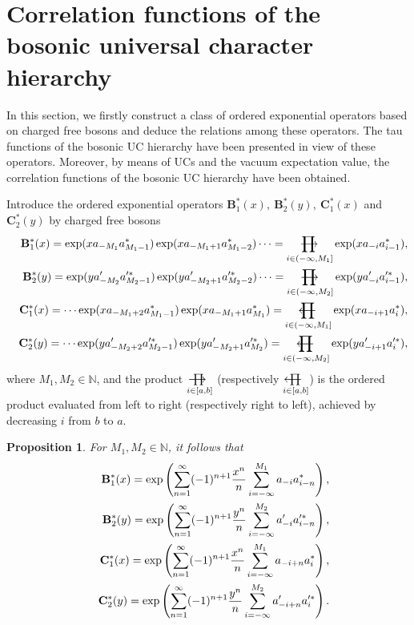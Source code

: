 \documentclass[10pt,a4paper]{amsart}
\numberwithin{equation}{section}
\newtheorem{proposition}[theorem]{Proposition}
\def\lprod{\mathop{\prod{\mkern-29.5mu}{\mathbf\longleftarrow}}}
\def\rprod{\mathop{\prod{\mkern-28.0mu}{\mathbf\longrightarrow}}}
\begin{document}
\section{Correlation functions of the bosonic universal character hierarchy}
In this section, we firstly construct a class of ordered exponential operators based on charged free bosons and deduce the relations among these operators. The tau functions of the bosonic UC hierarchy have been presented in view of these operators. Moreover, by means of UCs and  the vacuum expectation value, the correlation functions of the bosonic UC hierarchy have been obtained.



Introduce the ordered exponential operators $\mathbf{B}^{\ast}_{1}(x),\ \mathbf{B}^{\ast}_{2}(y),\ \mathbf{C}^{\ast}_{1}(x)$ and $\mathbf{C}^{\ast}_{2}(y)$  by charged free bosons
\begin{eqnarray}
&&\mathbf{B}^{\ast}_{1}(x)=\exp(xa_{-M_{1}}a^{\ast}_{M_{1}-1})
\exp(xa_{-M_{1}+1}a^{\ast}_{M_{1}-2})\cdots=\rprod\limits
_{i\in(-\infty,M_{1}]}\exp(xa_{-i}a^{\ast}_{i-1}),\notag\\
&&\mathbf{B}^{\ast}_{2}(y)=\exp(ya^{\prime}_{-M_{2}}a^{\prime\ast}_{M_{2}-1})
\exp(ya^{\prime}_{-M_{2}+1}a^{\prime\ast}_{M_{2}-2})\cdots=\rprod\limits
_{i\in(-\infty,M_{2}]}\exp(ya^{\prime}_{-i}a^{\prime\ast}_{i-1}),\notag\\
&&\mathbf{C}^{\ast}_{1}(x)=\cdots\exp(xa_{-M_{1}+2}a^{\ast}_{M_{1}-1})
\exp(xa_{-M_{1}+1}a^{\ast}_{M_{1}})=\lprod\limits_{i\in(-\infty,M_{1}]}
\exp(xa_{-i+1}a^{\ast}_{i}),\notag\\
&&\mathbf{C}^{\ast}_{2}(y)=\cdots\exp(ya^{\prime}_{-M_{2}+2}a^{\prime\ast}_{M_{2}-1})
\exp(ya^{\prime}_{-M_{2}+1}a^{\prime\ast}_{M_{2}})=\lprod\limits_{i\in(-\infty,M_{2}]}
\exp(ya^{\prime}_{-i+1}a^{\prime\ast}_{i}),
\end{eqnarray}
where $M_{1},M_{2}\in\mathbb{N}$, and the product $\rprod\limits_{i\in[a,b]}$ (respectively $\lprod\limits_{i\in[a,b]}$) is the ordered product evaluated from left to right (respectively right to left), achieved by decreasing $i$ from $b$ to $a$.

\begin{proposition}\label{Bzong}
For $M_{1},M_{2}\in\mathbb{N}$, it follows that
\begin{eqnarray}
&&\mathbf{B}^{\ast}_{1}(x)=\exp\left(\sum\limits^{\infty}_{n=1}(-1)^{n+1}
\frac{x^{n}}{n}\sum\limits^{M_{1}}_{i=-\infty}a_{-i}a^{\ast}_{i-n}\right),\notag\\
&&\mathbf{B}^{\ast}_{2}(y)=\exp\left(\sum\limits^{\infty}_{n=1}(-1)^{n+1}
\frac{y^{n}}{n}\sum\limits^{M_{2}}_{i=-\infty}a^{\prime}_{-i}
a^{\prime\ast}_{i-n}\right),\notag\\
&&\mathbf{C}^{\ast}_{1}(x)=\exp\left(\sum\limits^{\infty}_{n=1}(-1)^{n+1}
\frac{x^{n}}{n}\sum\limits^{M_{1}}_{i=-\infty}a_{-i+n}a^{\ast}_{i}\right),\notag\\
&&\mathbf{C}^{\ast}_{2}(y)=\exp\left(\sum\limits^{\infty}_{n=1}(-1)^{n+1}
\frac{y^{n}}{n}\sum\limits^{M_{2}}_{i=-\infty}a^{\prime}_{-i+n}a^{\prime\ast}_{i}\right).
\end{eqnarray}
\end{proposition}
\end{document}

